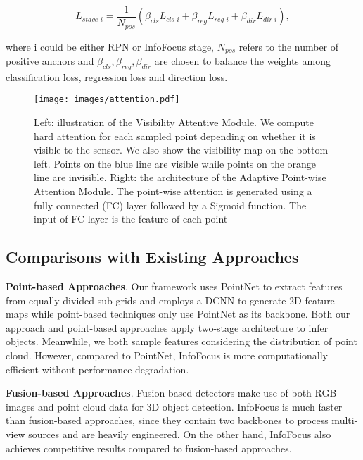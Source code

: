 \documentclass[runningheads]{llncs}
\begin{document}
\begin{equation}
 L_{stage\_i} = \frac{1}{N_{pos}} (\beta_{cls} L_{cls\_i} + \beta_{reg} L_{reg\_i} + \beta_{dir} L_{dir\_i} ),
\end{equation}

where i could be either RPN or InfoFocus stage, $N_{pos}$ refers to the number of positive anchors and $  \beta_{cls}, \beta_{reg}, \beta_{dir} $ are chosen to balance the weights among classification loss, regression loss and direction loss. 

\begin{figure}[t]
\centering
  \texttt{[image: images/attention.pdf]}
  \\
  \caption{Left: illustration of the Visibility Attentive Module. We compute hard attention for each sampled point depending on whether it is visible to the sensor. We also show the visibility map on the bottom left. Points on the blue line are visible while points on the orange line are invisible. Right: the architecture of the Adaptive Point-wise Attention Module. The point-wise attention is generated using a fully connected (FC) layer followed by a Sigmoid function. The input of FC layer is the feature of each point}
\label{fig:visibility}
\end{figure}

\subsection{Comparisons with Existing Approaches}
\noindent\textbf{Point-based Approaches}. Our framework uses PointNet to extract features from equally divided sub-grids and employs a DCNN to generate 2D feature maps while point-based techniques \cite{qi2018frustum,wang2019frustum,Lan_2019_CVPR,shi2019pointrcnn} only use PointNet as its backbone. Both our approach and point-based approaches apply two-stage architecture to infer objects. Meanwhile, we both sample features considering the distribution of point cloud. However, compared to PointNet, InfoFocus is more computationally efficient without performance degradation.

\noindent\textbf{Fusion-based Approaches}. Fusion-based detectors \cite{chen2019fast,liu2019point} make use of both RGB images and point cloud data for 3D object detection. InfoFocus is much faster than fusion-based approaches, since they contain two backbones to process multi-view sources and are heavily engineered. On the other hand, InfoFocus also achieves competitive results compared to fusion-based approaches. 
\end{document}
